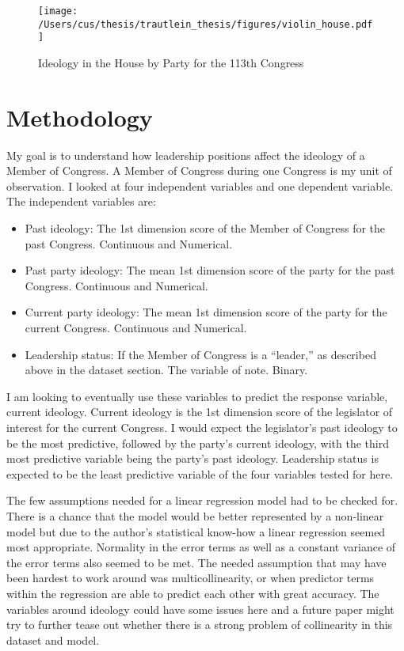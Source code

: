 \documentclass[12pt,twoside]{reedthesis}
\begin{document}
  \begin{figure}[h!tbp]
  \centering
  \texttt{[image: /Users/cus/thesis/trautlein\_thesis/figures/violin\_house.pdf]}
  \caption[Ideology in the House by Party for the 113th Congress]{\normalsize{Ideology in the House by Party for the 113th Congress}}
  \label{fig:def}
  \end{figure}
  
  \section{Methodology}\label{methodology}
  
  My goal is to understand how leadership positions affect the ideology of
  a Member of Congress. A Member of Congress during one Congress is my
  unit of observation. I looked at four independent variables and one
  dependent variable. The independent variables are:
  
  \begin{itemize}
  \itemsep1pt\parskip0pt
  \item
    Past ideology: The 1st dimension score of the Member of Congress for
    the past Congress. Continuous and Numerical.
  \item
    Past party ideology: The mean 1st dimension score of the party for the
    past Congress. Continuous and Numerical.
  \item
    Current party ideology: The mean 1st dimension score of the party for
    the current Congress. Continuous and Numerical.
  \item
    Leadership status: If the Member of Congress is a ``leader,'' as
    described above in the dataset section. The variable of note. Binary.
  \end{itemize}
  
  I am looking to eventually use these variables to predict the response
  variable, current ideology. Current ideology is the 1st dimension score
  of the legislator of interest for the current Congress. I would expect
  the legislator's past ideology to be the most predictive, followed by
  the party's current ideology, with the third most predictive variable
  being the party's past ideology. Leadership status is expected to be the
  least predictive variable of the four variables tested for here.
  
  The few assumptions needed for a linear regression model had to be
  checked for. There is a chance that the model would be better
  represented by a non-linear model but due to the author's statistical
  know-how a linear regression seemed most appropriate. Normality in the
  error terms as well as a constant variance of the error terms also
  seemed to be met. The needed assumption that may have been hardest to
  work around was multicollinearity, or when predictor terms within the
  regression are able to predict each other with great accuracy. The
  variables around ideology could have some issues here and a future paper
  might try to further tease out whether there is a strong problem of
  collinearity in this dataset and model.
  
\end{document}

